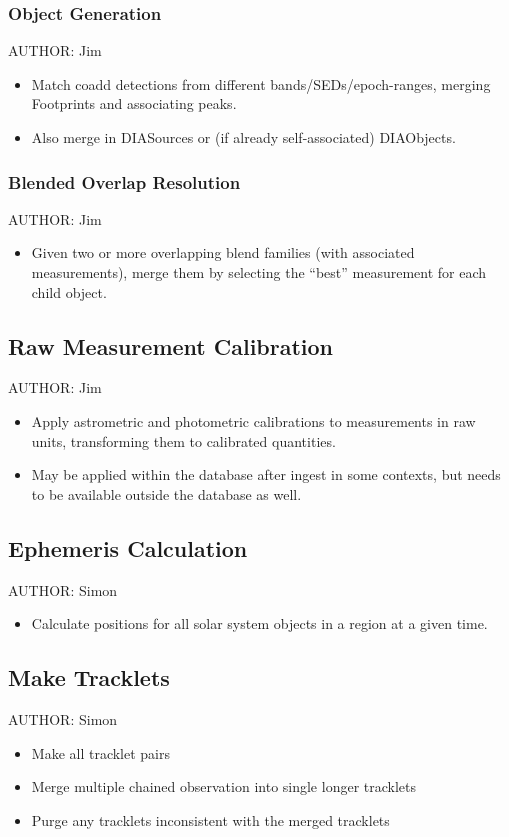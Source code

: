 \subsubsection{Object Generation}
\label{sec:acObjectGeneration}
AUTHOR: Jim
\begin{itemize}
\item Match coadd detections from different bands/SEDs/epoch-ranges, merging Footprints and associating peaks.
\item Also merge in DIASources or (if already self-associated) DIAObjects.
\end{itemize}

\subsubsection{Blended Overlap Resolution}
\label{sec:acBlendedOverlapResolution}
AUTHOR: Jim
\begin{itemize}
\item Given two or more overlapping blend families (with associated measurements), merge them by selecting the ``best'' measurement for each child object.
\end{itemize}

\subsection{Raw Measurement Calibration}
\label{sec:acRawMeasurementCalibration}

AUTHOR: Jim
\begin{itemize}
\item Apply astrometric and photometric calibrations to measurements in raw units, transforming them to calibrated quantities.
\item May be applied within the database after ingest in some contexts, but needs to be available outside the database as well.
\end{itemize}


\subsection{Ephemeris Calculation}
\label{sec:acEphemerisCalculation}
AUTHOR: Simon
\begin{itemize}
\item Calculate positions for all solar system objects in a region at a given time.
\end{itemize}

\subsection{Make Tracklets}
\label{sec:acMakeTracklets}
AUTHOR: Simon
\begin{itemize}
\item Make all tracklet pairs
\item Merge multiple chained observation into single longer tracklets
\item Purge any tracklets inconsistent with the merged tracklets
\end{itemize}

